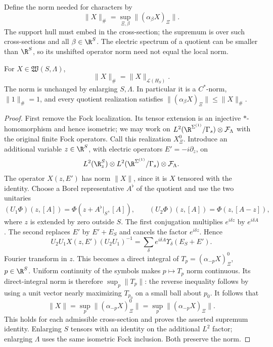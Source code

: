 Define the norm needed for characters by
\begin{equation}\label{eq:diag-sharp-norm}
 \|X\|_\#=\sup_{\Xi,\beta}\| (\alpha_\beta X)_\Xi\|.
\end{equation}
The support hull must embed in the cross-section; the supremum is
over such cross-sections and all $\beta\in\R^S$. The electric spectrum
of a quotient can be smaller than $\R^S$, so its unshifted operator
norm need not equal the local norm.

\begin{proposition}\label{prop:diag-local-norm}
For $X\in\mathfrak W(S,\Lambda)$,
\[
 \|X\|_\#=\|X\|_{\mathcal L(H_S)}.
\]
The norm is unchanged by enlarging $S,\Lambda$. In particular it is
a $C^*$-norm, $\|1\|_\#=1$, and every quotient realization satisfies
$\|(\alpha_\beta X)_\Xi\|\le\|X\|_\#$.
\end{proposition}

\begin{proof}
First remove the Fock localization. Its tensor extension is an
injective $*$-homomorphism and hence isometric; we may work on
$L^2(\R^{\Sigma^{(1)}}/\Gamma_s)\otimes\mathcal F_\Lambda$ with the
original finite Fock operators. Call this realization $X_\Xi^0$.
Introduce an additional variable $z\in\R^S$, with electric operators
$E'=-i\partial_z$, on
\[
 L^2(\R^S_z)\otimes
 L^2(\R^{\Sigma^{(1)}}/\Gamma_s)\otimes\mathcal F_\Lambda.
\]
The operator $X(z,E')$ has norm $\|X\|$, since it is $X$ tensored
with the identity. Choose a Borel representative $A^\flat$ of the
quotient and use the two unitaries
\[
 (U_1\Phi)(z,[A])=\Phi(z+A^\flat|_S,[A]),\qquad
 (U_2\Phi)(z,[A])=\Phi(z,[A-z]),
\]
where $z$ is extended by zero outside $S$. The first conjugation
multiplies $e^{i\delta z}$ by $e^{i\delta A}$. The second replaces
$E'$ by $E'+E_S$ and cancels the factor $e^{i\delta z}$. Hence
\[
 U_2U_1X(z,E')(U_2U_1)^{-1}
       =\sum_\delta e^{i\delta A}\Upsilon_\delta(E_S+E').
\]
Fourier transform in $z$. This becomes a direct integral of
$T_p=(\alpha_{-p}X)_\Xi^0$, $p\in\R^S$. Uniform continuity of the
symbols makes $p\mapsto T_p$ norm continuous. Its direct-integral
norm is therefore $\sup_p\|T_p\|$: the reverse inequality follows
by using a unit vector nearly maximizing $T_{p_0}$ on a small ball
about $p_0$. It follows that
\[
 \|X\|=\sup_p\| (\alpha_{-p}X)_\Xi^0\|
        =\sup_p\| (\alpha_{-p}X)_\Xi\|.
\]
This holds for each admissible cross-section and proves the asserted
supremum identity. Enlarging $S$ tensors with an identity on the
additional $L^2$ factor; enlarging $\Lambda$ uses the same isometric
Fock inclusion. Both preserve the norm.
\end{proof}

